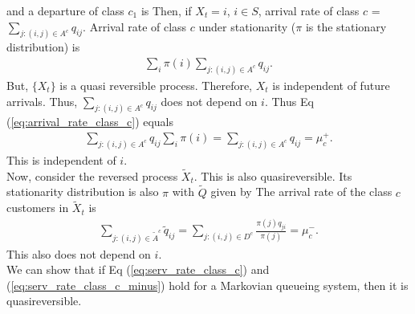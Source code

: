 \documentclass[all-lectures.tex]{subfiles}
\begin{document}
and a departure of class $c_1$ is 
Then, if $X_t = i$, $i \in S$, arrival rate of class $c$ = $\sum_{j:(i,j) \in A^c} q_{ij}$. Arrival rate of class $c$ under stationarity ($\pi$ is the stationary distribution) is 
\begin{align}
\label{eq:arrival_rate_class_c}
\sum_i \pi(i) \sum_{j:(i,j) \in A^c} q_{ij}.
\end{align}
But, $\{X_t\}$ is a quasi reversible process. Therefore, $X_t$ is independent of future arrivals. Thus, $\sum_{j:(i,j) \in A^c} q_{ij}$ does not depend on $i$. Thus Eq (\ref{eq:arrival_rate_class_c}) equals
\begin{align}\label{eq:serv_rate_class_c}
\sum_{j:(i,j) \in A^c} q_{ij} \sum_i \pi(i) = \sum_{j:(i,j) \in A^c} q_{ij} = \mu^+_c.
\end{align}
This is independent of $i$.\\
\indent Now, consider the reversed process $\tilde{X}_t$. This is also quasireversible. Its stationarity distribution is also $\pi$ with $\tilde{Q}$ given by 
The arrival rate of the class $c$ customers in $\tilde{X}_t$ is 
\begin{align} \label{eq:serv_rate_class_c_minus}
\sum_{j:(i,j) \in \tilde{A}^c}  \tilde{q}_{ij}  = \sum_{j:(i,j) \in D^c} \frac{\pi(j) q_{ji}}{\pi(j)} = \mu^-_c.
\end{align}
This also does not depend on $i$. \\
\indent We can show that if Eq (\ref{eq:serv_rate_class_c}) and (\ref{eq:serv_rate_class_c_minus}) hold for a Markovian queueing system, then it is quasireversible.
\end{document}
